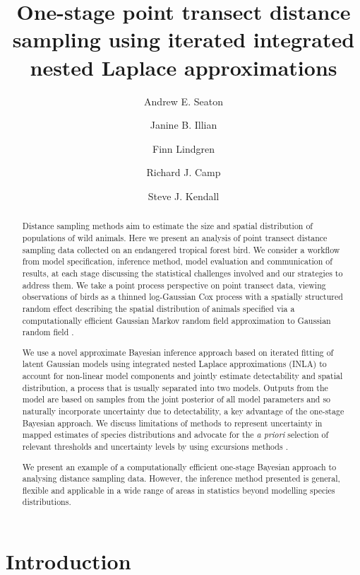 \documentclass{stylefile16/statsoc}
\title[One-stage point transect distance sampling using iterated INLA]{One-stage point transect distance sampling using iterated integrated nested Laplace approximations}
\author[Andrew E. Seaton {\it et al.}]{Andrew E. Seaton}
\author{Janine B. Illian}
\author{Finn Lindgren}
\author{Richard J. Camp}
\author[Andrew E. Seaton \textit{et al.}]{Steve J. Kendall}
\begin{document}
\begin{abstract}
Distance sampling methods aim to estimate the size and spatial distribution of populations of wild animals.  Here we present an analysis of point transect distance sampling data collected on an endangered tropical forest bird.  We consider a workflow from model specification, inference method, model evaluation and communication of results, at each stage discussing the statistical challenges involved and our strategies to address them.  We take a point process perspective on point transect data, viewing observations of birds as a thinned log-Gaussian Cox process with a spatially structured random effect describing the spatial distribution of animals specified via a computationally efficient Gaussian Markov random field approximation to Gaussian random field \citep{lindgren_explicit_2011}.  

We use a novel approximate Bayesian inference approach based on iterated fitting of latent Gaussian models using integrated nested Laplace approximations (INLA) \citep{rue_approximate_2009} to account for non-linear model components and jointly estimate detectability and spatial distribution, a process that is usually separated into two models.  Outputs from the model are based on samples from the joint posterior of all model parameters and so naturally incorporate uncertainty due to detectability, a key advantage of the one-stage Bayesian approach.  We discuss limitations of methods to represent uncertainty in mapped estimates of species distributions and advocate for the \textit{a priori} selection of relevant thresholds and uncertainty levels by using excursions methods \citep{bolin_excursion_2015}.

We present an example of a computationally efficient one-stage Bayesian approach to analysing distance sampling data.  However, the inference method presented is general, flexible and applicable in a wide range of areas in statistics beyond modelling species distributions.

\end{abstract}




\section{Introduction}
\end{document}
